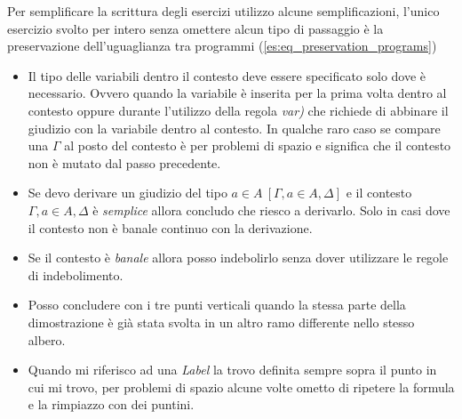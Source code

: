 Per semplificare la scrittura degli esercizi utilizzo alcune semplificazioni, l'unico esercizio svolto per intero senza omettere alcun tipo di passaggio è la preservazione dell'uguaglianza tra programmi (\ref{es:eq_preservation_programs})

\begin{itemize}
    \item Il tipo delle variabili dentro il contesto deve essere specificato solo dove è necessario. Ovvero quando la variabile è inserita per la prima volta dentro al contesto oppure durante l'utilizzo della regola \textit{var)} che richiede di abbinare il giudizio con la variabile dentro al contesto. In qualche raro caso se compare una $\Gamma$ al posto del contesto è per problemi di spazio e significa che il contesto non è mutato dal passo precedente.
    \item Se devo derivare un giudizio del tipo $a \in A\ [\Gamma, a \in A, \Delta]$ e il contesto $\Gamma, a \in A, \Delta$ è \textit{semplice} allora concludo che riesco a derivarlo. Solo in casi dove il contesto non è banale continuo con la derivazione.
    \item Se il contesto è \textit{banale} allora posso indebolirlo senza dover utilizzare le regole di indebolimento.
    \item Posso concludere con i tre punti verticali quando la stessa parte della dimostrazione è già stata svolta in un altro ramo differente nello stesso albero.
    \item Quando mi riferisco ad una \textit{Label} la trovo definita sempre sopra il punto in cui mi trovo, per problemi di spazio alcune volte ometto di ripetere la formula e la rimpiazzo con dei puntini.
\end{itemize}